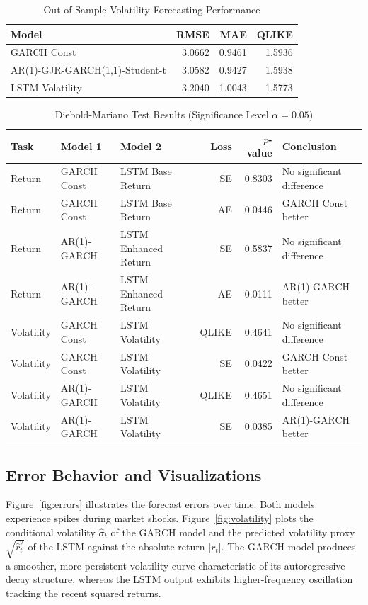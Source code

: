 \documentclass[11pt,a4paper]{article}
\begin{document}
\begin{table}[H]
\centering
\caption{Out-of-Sample Volatility Forecasting Performance}
\label{tab:volatility}
\begin{tabular}{lrrr}
\toprule
Model & RMSE & MAE & QLIKE \\
\midrule
GARCH Const & 3.0662 & 0.9461 & 1.5936 \\
AR(1)-GJR-GARCH(1,1)-Student-t & 3.0582 & 0.9427 & 1.5938 \\
LSTM Volatility & 3.2040 & 1.0043 & 1.5773 \\
\bottomrule
\end{tabular}
\end{table}

\begin{table}[H]
\centering
\caption{Diebold-Mariano Test Results (Significance Level $\alpha=0.05$)}
\label{tab:dm}
\begin{tabular}{lllrrl}
\toprule
Task & Model 1 & Model 2 & Loss & $p$-value & Conclusion \\
\midrule
Return & GARCH Const & LSTM Base Return & SE & 0.8303 & No significant difference \\
Return & GARCH Const & LSTM Base Return & AE & 0.0446 & GARCH Const better \\
Return & AR(1)-GARCH & LSTM Enhanced Return & SE & 0.5837 & No significant difference \\
Return & AR(1)-GARCH & LSTM Enhanced Return & AE & 0.0111 & AR(1)-GARCH better \\
\midrule
Volatility & GARCH Const & LSTM Volatility & QLIKE & 0.4641 & No significant difference \\
Volatility & GARCH Const & LSTM Volatility & SE & 0.0422 & GARCH Const better \\
Volatility & AR(1)-GARCH & LSTM Volatility & QLIKE & 0.4651 & No significant difference \\
Volatility & AR(1)-GARCH & LSTM Volatility & SE & 0.0385 & AR(1)-GARCH better \\
\bottomrule
\end{tabular}
\end{table}

\subsection{Error Behavior and Visualizations}
Figure~\ref{fig:errors} illustrates the forecast errors over time. Both models experience spikes during market shocks. Figure~\ref{fig:volatility} plots the conditional volatility $\hat{\sigma}_t$ of the GARCH model and the predicted volatility proxy $\sqrt{\hat{r}_t^2}$ of the LSTM against the absolute return $|r_t|$. The GARCH model produces a smoother, more persistent volatility curve characteristic of its autoregressive decay structure, whereas the LSTM output exhibits higher-frequency oscillation tracking the recent squared returns. 
\end{document}
